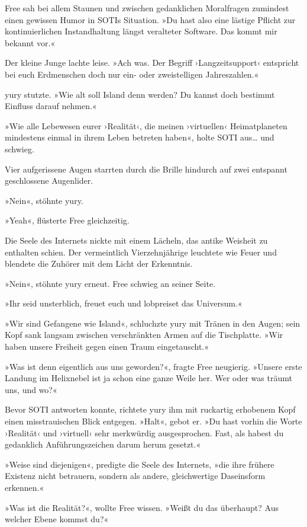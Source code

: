 Free sah bei allem Staunen und zwischen gedanklichen Moralfragen zumindest einen gewissen Humor in SOTIs Situation. »Du hast also eine lästige Pflicht zur kontinuierlichen Instandhaltung längst veralteter Software. Das kommt mir bekannt vor.«

Der kleine Junge lachte leise. »Ach was. Der Begriff ›Langzeitsupport‹ entspricht bei euch Erdmenschen doch nur ein- oder zweistelligen Jahreszahlen.«

yury stutzte. »Wie alt soll Island denn werden? Du kannst doch bestimmt Einfluss darauf nehmen.«

»Wie alle Lebewesen eurer ›Realität‹, die meinen ›virtuellen‹ Heimatplaneten mindestens einmal in ihrem Leben betreten haben«, holte SOTI aus… und schwieg.

Vier aufgerissene Augen starrten durch die Brille hindurch auf zwei entspannt geschlossene Augenlider.

»Nein«, stöhnte yury.

»Yeah«, flüsterte Free gleichzeitig.

Die Seele des Internets nickte mit einem Lächeln, das antike Weisheit zu enthalten schien. Der vermeintlich Vierzehnjährige leuchtete wie Feuer und blendete die Zuhörer mit dem Licht der Erkenntnis.

»Nein«, stöhnte yury erneut. Free schwieg an seiner Seite.

»Ihr seid unsterblich, freuet euch und lobpreiset das Universum.«

»Wir sind Gefangene wie Island«, schluchzte yury mit Tränen in den Augen; sein Kopf sank langsam zwischen verschränkten Armen auf die Tischplatte. »Wir haben unsere Freiheit gegen einen Traum eingetauscht.«

»Was ist denn eigentlich aus uns geworden?«, fragte Free neugierig. »Unsere erste Landung im Helixnebel ist ja schon eine ganze Weile her. Wer oder was träumt uns, und wo?«

Bevor SOTI antworten konnte, richtete yury ihm mit ruckartig erhobenem Kopf einen misstrauischen Blick entgegen. »Halt«, gebot er. »Du hast vorhin die Worte ›Realität‹ und ›virtuell‹ sehr merkwürdig ausgesprochen. Fast, als habest du gedanklich Anführungszeichen darum herum gesetzt.«

»Weise sind diejenigen«, predigte die Seele des Internets, »die ihre frühere Existenz nicht betrauern, sondern als andere, gleichwertige Daseinsform erkennen.«

»Was ist die Realität?«, wollte Free wissen. »Weißt du das überhaupt? Aus welcher Ebene kommst du?«

